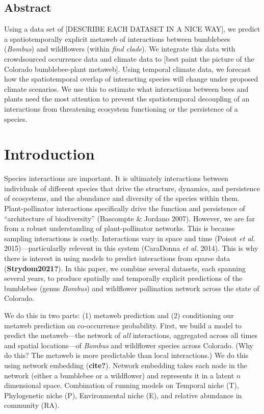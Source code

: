 \documentclass[11pt]{article}
\begin{document}
\vfill

\clearpage
\linenumbers
\pagestyle{normal}

\hypertarget{abstract}{%
\subsection{Abstract}\label{abstract}}

Using a data set of {[}DESCRIBE EACH DATASET IN A NICE WAY{]}, we
predict a spatiotemporally explicit metaweb of interactions between
bumblebees (\emph{Bombus}) and wildflowers (within \emph{find clade}).
We integrate this data with crowdsourced occurrence data and climate
data to {[}best paint the picture of the Colorado bumblebee-plant
metaweb{]}. Using temporal climate data, we forecast how the
spatiotemporal overlap of interacting species will change under proposed
climate scenarios. We use this to estimate what interactions between
bees and plants need the most attention to prevent the spatiotemporal
decoupling of an interactions from threatening ecosystem functioning or
the persistence of a species.

\hypertarget{introduction}{%
\section{Introduction}\label{introduction}}

Species interactions are important. It is ultimately interactions
between individuals of different species that drive the structure,
dynamics, and persistence of ecosystems, and the abundance and diversity
of the species within them. Plant-pollinator interactions specifically
drive the function and persistence of ``architecture of biodiversity''
(Bascompte \& Jordano 2007). However, we are far from a robust
understanding of plant-pollinator networks. This is because sampling
interactions is costly. Interactions vary in space and time (Poisot
\emph{et al.} 2015)---particularlly relevent in this system (CaraDonna
\emph{et al.} 2014). This is why there is interest in using models to
predict interactions from sparse data (\textbf{Strydom2021?}). In this
paper, we combine several datasets, each spanning several years, to
produce spatially and temporally explicit predictions of the bumblebee
(genus \emph{Bombus}) and wildflower pollination network across the
state of Colorado.

We do this in two parts: (1) metaweb prediction and (2) conditioning our
metaweb prediction on co-occurrence probability. First, we build a model
to predict the metaweb---the network of \emph{all} interactions,
aggregated across all times and spatial locations---of \emph{Bombus} and
wildflower species across Colorado. (Why do this? The metaweb is more
predictable than local interactions.) We do this using network embedding
(\textbf{cite?}). Network embedding takes each node in the network
(either a bumblebee or a wildflower) and represents it in a latent \(n\)
dimensional space. Combination of running models on Temporal niche (T),
Phylogenetic niche (P), Environmental niche (E), and relative abundance
in community (RA).
\end{document}
